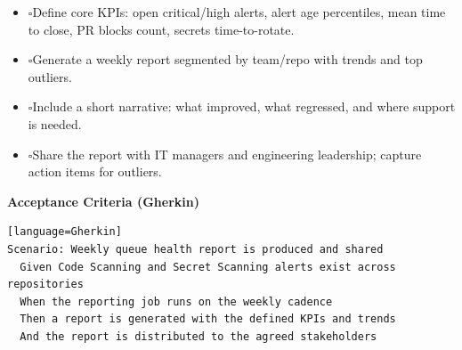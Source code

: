 \documentclass[11pt,a4paper]{article}
\newcommand{\checkbox}{\(\square\)}
\let\cb\checkbox
\newenvironment{TasksBox}[1][Tasks]{%
  \begin{tcolorbox}[
    enhanced,breakable,
    colback=gray!1, colframe=gray!35,
    colbacktitle=gray!6, coltitle=black,
    title={#1}, fonttitle=\bfseries,
    borderline west={1.8pt}{0pt}{MidnightBlue},
    arc=2pt, boxrule=0.4pt,
    left=10pt,right=10pt,top=6pt,bottom=6pt,
    before skip=6pt, after skip=10pt
  ]
  \small
  \begin{itemize}[label=\cb, leftmargin=*, labelsep=0.6em, itemsep=4pt, topsep=2pt, parsep=0pt]
}{%
  \end{itemize}
  \end{tcolorbox}
}
\begin{document}
\begin{TasksBox}[Implementation Tasks]
  \item \cb Define core KPIs: open critical/high alerts, alert age percentiles, mean time to close, PR blocks count, secrets time-to-rotate.
  \item \cb Generate a weekly report segmented by team/repo with trends and top outliers.
  \item \cb Include a short narrative: what improved, what regressed, and where support is needed.
  \item \cb Share the report with IT managers and engineering leadership; capture action items for outliers.
\end{TasksBox}

\textbf{Acceptance Criteria (Gherkin)}
\begin{verbatim}[language=Gherkin]
Scenario: Weekly queue health report is produced and shared
  Given Code Scanning and Secret Scanning alerts exist across repositories
  When the reporting job runs on the weekly cadence
  Then a report is generated with the defined KPIs and trends
  And the report is distributed to the agreed stakeholders
\end{verbatim}

\clearpage
\end{document}

